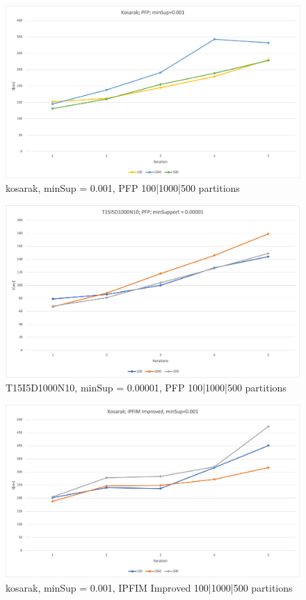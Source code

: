 \begin{figure}
  \centering
  \includegraphics[width=\linewidth]{figures/4iterations/kosarak_pfp_001}
  \caption{kosarak, minSup = 0.001, PFP 100|1000|500 partitions}
  \label{fig:kosarak_pfp_001}
\end{figure}

\begin{figure}
  \centering
  \includegraphics[width=\linewidth]{figures/4iterations/T15I5D1000N10_pfp_00001}
  \caption{T15I5D1000N10, minSup = 0.00001, PFP 100|1000|500 partitions}
  \label{fig:T15I5D1000N10_pfp_00001}
\end{figure}

\begin{figure}
  \centering
  \includegraphics[width=\linewidth]{figures/4iterations/kosarak_ipfim_imp_001}
  \caption{kosarak, minSup = 0.001, IPFIM Improved 100|1000|500 partitions}
  \label{fig:kosarak_ipfim_imp_001}
\end{figure}

